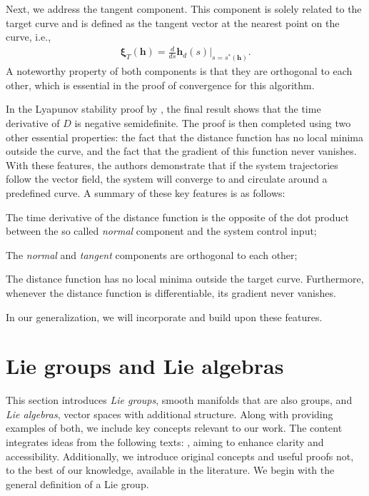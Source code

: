 Next, we address the tangent component. This component is solely related to the target curve and is defined as the tangent vector at the nearest point on the curve, i.e.,
\begin{align}
    \boldsymbol{\xi}_{T}(\mathbf{h}) = \frac{d}{ds}\mathbf{h}_d(s)|_{s=s^*(\mathbf{h})}.
\end{align}
A noteworthy property of both components is that they are orthogonal to each other, which is essential in the proof of convergence for this algorithm.

In the Lyapunov stability proof by \citet{Rezende2022}, the final result shows that the time derivative of $D$ is negative semidefinite. The proof is then completed using two other essential properties: the fact that the distance function has no local minima outside the curve, and the fact that the gradient of this function never vanishes. With these features, the authors demonstrate that if the system trajectories follow the vector field, the system will converge to and circulate around a predefined curve. A summary of these key features is as follows:
\begin{feature}
    \item The time derivative of the distance function is the opposite of the dot product between the so called \emph{normal} component and the system control input; \label{feat:adriano-time-derivative-lyapunov-normal-comp}
    \item The \emph{normal} and \emph{tangent} components are orthogonal to each other; \label{feat:adriano-orthogonality}
    \item The distance function has no local minima outside the target curve. Furthermore, whenever the distance function is differentiable, its gradient never vanishes. \label{feat:adriano-no-local-minima}
\end{feature}
In our generalization, we will incorporate and build upon these features.

\section{Lie groups and Lie algebras}\label{sec:background-lie-theory}
This section introduces \emph{Lie groups}, smooth manifolds that are also groups, and \emph{Lie algebras}, vector spaces with additional structure. Along with providing examples of both, we include key concepts relevant to our work. The content integrates ideas from the following texts: \citet{Lee2012,Gallier2020,Hall2015,Duistermaat2012}, aiming to enhance clarity and accessibility. Additionally, we introduce original concepts and useful proofs not, to the best of our knowledge, available in the literature. We begin with the general definition of a Lie group.
